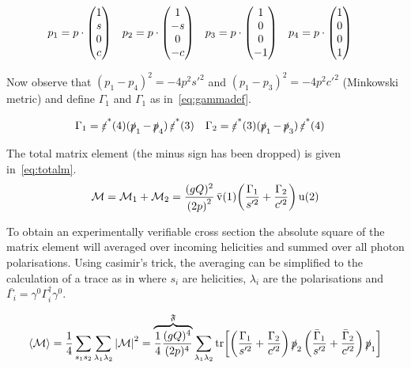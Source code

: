 \begin{align}
  \label{eq:pchoice}
  p_1&=p\cdot\mqty(1 \\ s \\ 0 \\ c)
     & p_2&=p\cdot\mqty(1 \\ -s \\ 0 \\ -c)
     & p_3&=p\cdot\mqty(1 \\ 0 \\ 0 \\ -1)
     & p_4&=p\cdot\mqty(1 \\ 0 \\ 0 \\ 1)
\end{align}

Now observe that \((p_1-p_4)^2=-4p^2s'^2\) and
\((p_1-p_3)^2=-4p^2c'^2\) (Minkowski metric) and define \(\Gamma_1\)
and \(\Gamma_1\) as in~\eqref{eq:gammadef}.

\begin{align}
  \label{eq:gammadef}
  \Gamma_1 &= \pses(4)(\ps_1 - \ps_4)\pses(3) &
  \Gamma_2 &= \pses(3)(\ps_1 - \ps_3)\pses(4)
\end{align}

The total matrix element (the minus sign has been dropped) is given in~\eqref{eq:totalm}.
\begin{equation}
  \label{eq:totalm}
  \mathcal{M} = \mathcal{M}_1 + \mathcal{M}_2 = \frac{(gQ)^2}{\qty(2p)^2}\operatorname{\bar{v}}(1)\qty(\frac{\Gamma_1}{s'^2}+\frac{\Gamma_2}{c'^2})\operatorname{u}(2)
\end{equation}

To obtain an experimentally verifiable cross section the absolute square of the
matrix element will averaged over incoming helicities and summed over
all photon polarisations.  Using casimir's trick, the averaging can be
simplified to the calculation of a trace as in where \(s_i\) are
helicities, \(\lambda_i\) are the polarisations and \(\bar{\Gamma_i}=\gamma^0\Gamma^\dagger_i\gamma^0\).

\begin{equation}
  \label{eq:averagedm}
  \langle\mathcal{M}\rangle = \frac{1}{4}\sum_{s_1 s_2}\sum_{\lambda_1
    \lambda_2} \abs{\mathcal{M}}^2=\overbrace{\frac{1}{4}\frac{(gQ)^4}{(2p)^4}}^\mathfrak{F}\sum_{\lambda_1
    \lambda_2}\tr[\qty(\frac{\Gamma_1}{s'^2}+\frac{\Gamma_2}{c'^2})
  \operatorname{\slashed{p}}_2\qty(\frac{\bar{\Gamma}_1}{s'^2}+\frac{\bar{\Gamma}_2}{c'^2})\operatorname{\slashed{p}}_1]
\end{equation}

